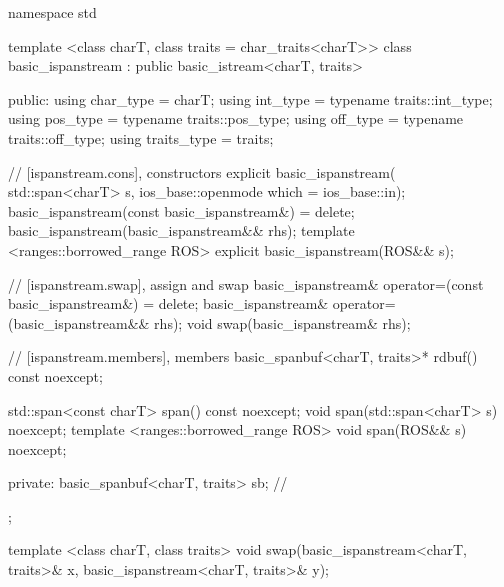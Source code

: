 \documentclass[ebook,11pt,article]{memoir}
\renewcommand{\iref}[1]{[#1]}
\begin{document}
\begin{codeblock}
namespace std {
  template <class charT, class traits = char_traits<charT>>
  class basic_ispanstream
    : public basic_istream<charT, traits> {
  public:
    using char_type      = charT;
    using int_type       = typename traits::int_type;
    using pos_type       = typename traits::pos_type;
    using off_type       = typename traits::off_type;
    using traits_type    = traits;

    // \iref{ispanstream.cons}, constructors
    explicit basic_ispanstream(
      std::span<charT> s,
      ios_base::openmode which = ios_base::in);
    basic_ispanstream(const basic_ispanstream&) = delete;
    basic_ispanstream(basic_ispanstream&& rhs);
    template <ranges::borrowed_range ROS>
    explicit basic_ispanstream(ROS&& s);

    // \iref{ispanstream.swap}, assign and swap
    basic_ispanstream& operator=(const basic_ispanstream&) = delete;
    basic_ispanstream& operator=(basic_ispanstream&& rhs);
    void swap(basic_ispanstream& rhs);

    // \iref{ispanstream.members}, members
    basic_spanbuf<charT, traits>* rdbuf() const noexcept;

    std::span<const charT> span() const noexcept;
    void span(std::span<charT> s) noexcept;
    template <ranges::borrowed_range ROS>
    void span(ROS&& s) noexcept;
    
  private:
    basic_spanbuf<charT, traits> sb; // \expos
  };

  template <class charT, class traits>
    void swap(basic_ispanstream<charT, traits>& x,
              basic_ispanstream<charT, traits>& y);
}
\end{codeblock}


\end{document}
